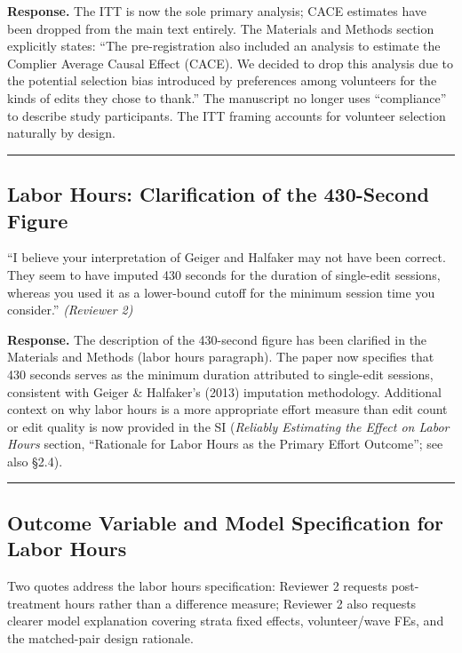 \documentclass[12pt]{article}
\newenvironment{reviewquote}{%
  \def\FrameCommand{{\color{quotebarcolor}\vrule width 2pt}\colorbox{quotebg}}%
  \MakeFramed{\advance\hsize-\width \FrameRestore}%
  \small
}{%
  \endMakeFramed
}
\newcommand{\sectionnote}[1]{\par\smallskip#1\par\medskip}
\begin{document}
\textbf{Response.} The ITT is now the sole primary analysis; CACE estimates have been dropped from the main text entirely. The Materials and Methods section explicitly states: ``The pre-registration also included an analysis to estimate the Complier Average Causal Effect (CACE). We decided to drop this analysis due to the potential selection bias introduced by preferences among volunteers for the kinds of edits they chose to thank.'' The manuscript no longer uses ``compliance'' to describe study participants. The ITT framing accounts for volunteer selection naturally by design.

\bigskip\hrule\bigskip

\subsection{Labor Hours: Clarification of the 430-Second Figure}

\begin{reviewquote}
``I believe your interpretation of Geiger and Halfaker may not have been correct. They seem to have imputed 430 seconds for the duration of single-edit sessions, whereas you used it as a lower-bound cutoff for the minimum session time you consider.'' \textit{(Reviewer 2)}
\end{reviewquote}

\textbf{Response.} The description of the 430-second figure has been clarified in the Materials and Methods (labor hours paragraph). The paper now specifies that 430 seconds serves as the minimum duration attributed to single-edit sessions, consistent with Geiger \& Halfaker's (2013) imputation methodology. Additional context on why labor hours is a more appropriate effort measure than edit count or edit quality is now provided in the SI (\textit{Reliably Estimating the Effect on Labor Hours} section, ``Rationale for Labor Hours as the Primary Effort Outcome''; see also \S2.4).

\bigskip\hrule\bigskip

\subsection{Outcome Variable and Model Specification for Labor Hours}

\sectionnote{Two quotes address the labor hours specification: Reviewer 2 requests post-treatment hours rather than a difference measure; Reviewer 2 also requests clearer model explanation covering strata fixed effects, volunteer/wave FEs, and the matched-pair design rationale.}
\end{document}
